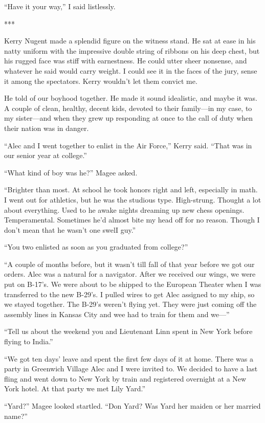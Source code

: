 {“Have it your way,” I said listlessly.

***

Kerry Nugent made a splendid figure on the witness stand. He sat at ease in his natty uniform with the impressive double string of ribbons on his deep chest, but his rugged face was stiff with earnestness. He could utter sheer nonsense, and whatever he said would carry weight. I could see it in the faces of the jury, sense it among the spectators. Kerry wouldn’t let them convict me.

He told of our boyhood together. He made it sound idealistic, and maybe it was. A couple of clean, healthy, decent kids, devoted to their family—in my case, to my sister—and when they grew up responding at once to the call of duty when their nation was in danger.

“Alec and I went together to enlist in the Air Force,” Kerry said. “That was in our senior year at college.”

“What kind of boy was he?” Magee asked.

“Brighter than most. At school he took honors right and left, especially in math. I went out for athletics, but he was the studious type. High-strung. Thought a lot about everything. Used to he awake nights dreaming up new chess openings. Temperamental. Sometimes he’d almost bite my head off for no reason. Though I don’t mean that he wasn’t one swelI guy.”

“You two enlisted as soon as you graduated from college?”

“A couple of months before, but it wasn’t till fall of that year before we got our orders. Alec was a natural for a navigator. After we received our wings, we were put on B-17’s. We were about to be shipped to the European Theater when I was transferred to the new B-29’s. I pulled wires to get Alec assigned to my ship, so we stayed together. The B-29’s weren’t flying yet. They were just coming off the assembly lines in Kansas City and wee had to train for them and we—”

“Tell us about the weekend you and Lieutenant Linn spent in New York before flying to India.”

“We got ten days’ leave and spent the first few days of it at home. There was a party in Greenwich Village Alec and I were invited to. We decided to have a last fling and went down to New York by train and registered overnight at a New York hotel. At that party we met Lily Yard.”

“Yard?” Magee looked startled. “Don Yard? Was Yard her maiden or her married name?”

}
